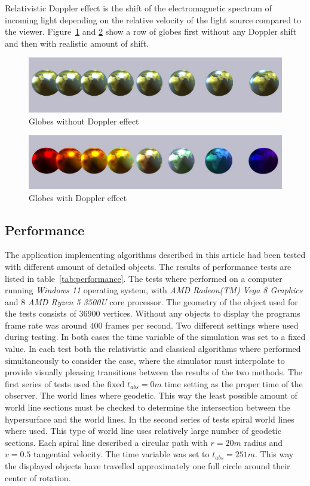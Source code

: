 \documentclass{egpubl}
\begin{document}
Relativistic Doppler effect is the shift of the electromagnetic spectrum of incoming light depending on the relative velocity of the light source compared to the viewer. Figure~\ref{fig:doppler_effect_1} and \ref{fig:doppler_effect_2} show a row of globes first without any Doppler shift and then with realistic amount of shift.
\begin{figure}[htb]
\center
\includegraphics[width=\linewidth]{figures/doppler_effect_off.jpg}
\caption{Globes without Doppler effect}
\label{fig:doppler_effect_1}
\end{figure}
\begin{figure}[htb]
\center
\includegraphics[width=\linewidth]{figures/doppler_effect.jpg}
\caption{Globes with Doppler effect}
\label{fig:doppler_effect_2}
\end{figure}

\subsection{Performance}
\label{sec:performance}
The application implementing algorithms described in this article had been tested with different amount of detailed objects. The results of performance tests are listed in table~\ref{tab:performance}. The tests where performed on a computer running \emph{Windows 11} operating system, with \emph{AMD Radeon(TM) Vega 8 Graphics} and 8 \emph{AMD Ryzen 5 3500U} core processor.
The geometry of the object used for the tests consists of $36900$ vertices. Without any objects to display the programs frame rate was around $400$ frames per second. Two different settings where used during testing. In both cases the time variable of the simulation was set to a fixed value. In each test both the relativistic and classical algorithms where performed simultaneously to consider the case, where the simulator must interpolate to provide visually pleasing transitions between the results of the two methods. 
The first series of tests used the fixed $t_{abs}=0 m$ time setting as the proper time of the observer. The world lines where geodetic. This way the least possible amount of world line sections must be checked to determine the intersection between the hypersurface and the world lines. In the second series of tests spiral world lines where used. This type of world line uses relatively large number of geodetic sections. Each spiral line described a circular path with $r=20 m$ radius and $v=0.5$ tangential velocity. The time variable was set to $t_{abs}=251 m$. This way the displayed objects have travelled approximately one full circle around their center of rotation.
\end{document}
